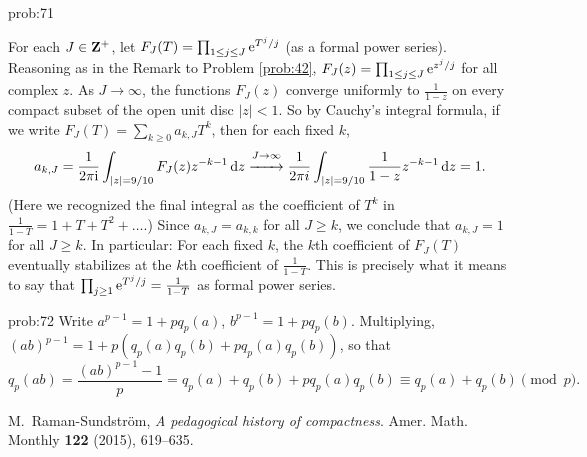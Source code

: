 \begin{sol}{prob:71}
\begin{rmk}
For each $J \in \mathbf{Z}^{+}$, let $F_J(T) = \prod_{1 \le j \le J} \mathrm{e}^{T^j/j}$ (as a formal power series). Reasoning as in the Remark to Problem \ref{prob:42}, $F_J(z) = \prod_{1\le j \le J} \mathrm{e}^{z^j/j}$ for all complex $z$. As $J\to\infty$, the functions $F_J(z)$ converge uniformly to $\frac{1}{1-z}$ on every compact subset of the open unit disc $|z|<1$. So by Cauchy's integral formula, if we write $F_{J}(T) = \sum_{k \ge 0}a_{k,J} T^k$, then for each fixed $k$,
\[ a_{k,J} = \frac{1}{2\pi \mathrm{i}}\int_{|z|=9/10} F_J(z) z^{-k-1}\,\mathrm{d}z \overset{J\to\infty}{\xrightarrow{\hspace{0.65cm}} } \frac{1}{2\pi i}\int_{|z|=9/10} \frac{1}{1-z} z^{-k-1}\,\mathrm{d}z = 1. \]
(Here we recognized the final integral as the coefficient of $T^{k}$ in $\frac{1}{1-T} = 1 + T +T^2 + \dots$.) Since $a_{k,J}=a_{k,k}$ for all $J\ge k$, we conclude that $a_{k,J}=1$ for all $J\ge k$. In particular: For each fixed $k$, the $k$th coefficient of $F_J(T)$ eventually stabilizes at the $k$th coefficient of $\frac{1}{1-T}$. This is precisely what it means to say that $\prod_{j\ge 1} \mathrm{e}^{T^j/j} = \frac{1}{1-T}$ as formal power series.
\end{rmk} 
\end{sol}



\begin{sol}{prob:72} Write $a^{p-1} = 1 + p q_p(a)$, $b^{p-1} = 1 + p q_p(b)$. Multiplying, $(ab)^{p-1} = 1 + p(q_p(a) q_p(b) + p q_p(a) q_p(b))$, so that
\[ q_p(ab) = \frac{(ab)^{p-1}-1}{p} = q_p(a) + q_p(b) + p q_p(a) q_p(b) \equiv q_p(a) + q_p(b)\!\!\pmod{p}. \]
\end{sol}


\let\oldaddcontentsline\addcontentsline
\renewcommand{\addcontentsline}[3]{}
\begin{thebibliography}{11}

  M.~Raman-Sundström, 
\emph{A pedagogical history of compactness}.
Amer. Math. Monthly \textbf{122} (2015),  619--635.
\end{thebibliography}
\let\addcontentsline\oldaddcontentsline